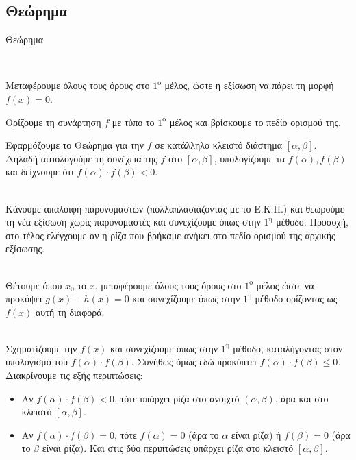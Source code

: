 \subsection{Θεώρημα }
\begin{askhsh}{Θεώρημα }
\begin{tropos}
\item {}
\\\bhmata\begin{bhma}
\item Μεταφέρουμε όλους τους όρους στο $1^\text{ο}$ μέλος, ώστε η εξίσωση να πάρει τη μορφή $f(x)=0$.
\item Ορίζουμε τη συνάρτηση $f$ με τύπο το $1^\text{ο}$ μέλος και βρίσκουμε το πεδίο ορισμού της.
\item Εφαρμόζουμε το Θεώρημα  για την $f$ σε κατάλληλο κλειστό διάστημα $[\alpha, \beta]$. Δηλαδή αιτιολογούμε τη συνέχεια της $f$ στο $[\alpha, \beta]$, υπολογίζουμε τα $f(\alpha), f(\beta)$ και δείχνουμε ότι $f(\alpha)\cdot f(\beta) < 0$.
\end{bhma}

\item {}\\
Κάνουμε απαλοιφή παρονομαστών (πολλαπλασιάζοντας με το Ε.Κ.Π.) και θεωρούμε τη νέα εξίσωση χωρίς παρονομαστές και συνεχίζουμε όπως στην $1^\text{η}$ μέθοδο. Προσοχή, στο τέλος ελέγχουμε αν η ρίζα που βρήκαμε ανήκει στο πεδίο ορισμού της αρχικής εξίσωσης.

\item {}\\
Θέτουμε όπου $x_0$ το $x$, μεταφέρουμε όλους τους όρους στο $1^\text{ο}$ μέλος ώστε να προκύψει $g(x)-h(x)=0$ και συνεχίζουμε όπως στην $1^\text{η}$ μέθοδο ορίζοντας ως $f(x)$ αυτή τη διαφορά.

\item {}\\
Σχηματίζουμε την $f(x)$ και συνεχίζουμε όπως στην $1^\text{η}$ μέθοδο, καταλήγοντας στον υπολογισμό του $f(\alpha)\cdot f(\beta)$. Συνήθως όμως εδώ προκύπτει $f(\alpha)\cdot f(\beta) \le 0$. Διακρίνουμε τις εξής περιπτώσεις:
\begin{itemize}
    \item Αν $f(\alpha)\cdot f(\beta) < 0$, τότε υπάρχει ρίζα στο ανοιχτό $(\alpha, \beta)$, άρα και στο κλειστό $[\alpha, \beta]$.
    \item Αν $f(\alpha)\cdot f(\beta) = 0$, τότε $f(\alpha)=0$ (άρα το $\alpha$ είναι ρίζα) ή $f(\beta)=0$ (άρα το $\beta$ είναι ρίζα). Και στις δύο περιπτώσεις υπάρχει ρίζα στο κλειστό $[\alpha, \beta]$.
\end{itemize}


\end{tropos}
\end{askhsh}
